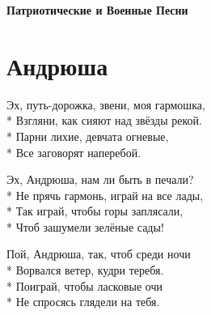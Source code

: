 \vspace{\fill}\newpage

\cleardoublepage
\thispagestyle{empty}
\vspace*{\fill}
{\centering\huge\bfseries Патриотические и Военные Песни\par}
\vspace*{\fill}
\newpage
\section{Андрюша}
\label{song:Андрюша}

\medskip

\begin{minipage}{\linewidth}
Эх, путь-дорожка, звени, моя гармошка,\\*
Взгляни, как сияют над звёзды рекой.\\*
Парни лихие, девчата огневые,\\*
Все заговорят наперебой.\\
\end{minipage}\par\medskip\nobreak

\medskip

\begin{minipage}{\linewidth}
\hspace*{1.5em}Эх, Андрюша, нам ли быть в печали?\\*
\hspace*{1.5em}Не прячь гармонь, играй на все лады,\\*
\hspace*{1.5em}Так играй, чтобы горы заплясали,\\*
\hspace*{1.5em}Чтоб зашумели зелёные сады!\\
\end{minipage}\par\medskip\nobreak

\medskip

\begin{minipage}{\linewidth}
\hspace*{1.5em}Пой, Андрюша, так, чтоб среди ночи\\*
\hspace*{1.5em}Ворвался ветер, кудри теребя.\\*
\hspace*{1.5em}Поиграй, чтобы ласковые очи\\*
\hspace*{1.5em}Не спросясь глядели на тебя.\\
\end{minipage}\par\medskip\nobreak


